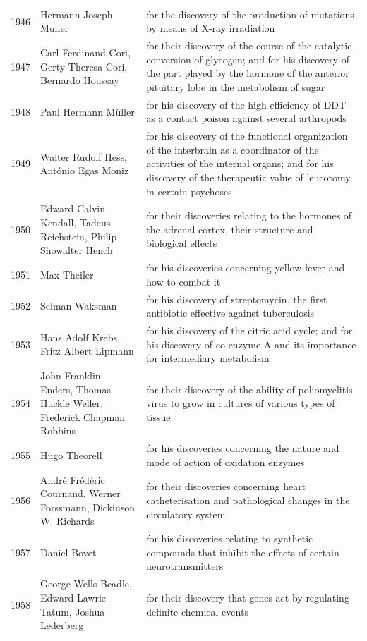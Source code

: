 \documentclass[12pt,a4paper]{book}
\begin{document}
{\begin{longtable}{cp{3.2cm}p{5.5cm}}
1946 & Hermann Joseph Muller & for the discovery of the production of mutations by means of X-ray irradiation \\
1947 & Carl Ferdinand Cori, Gerty Theresa Cori, Bernardo Houssay & for their discovery of the course of the catalytic conversion of glycogen; and for his discovery of the part played by the hormone of the anterior pituitary lobe in the metabolism of sugar \\
1948 & Paul Hermann M\"uller & for his discovery of the high efficiency of DDT as a contact poison against several arthropods \\
1949 & Walter Rudolf Hess, Ant\'onio Egas Moniz & for his discovery of the functional organization of the interbrain as a coordinator of the activities of the internal organs; and for his discovery of the therapeutic value of leucotomy in certain psychoses \\
1950 & Edward Calvin Kendall, Tadeus Reichstein, Philip Showalter Hench & for their discoveries relating to the hormones of the adrenal cortex, their structure and biological effects \\
1951 & Max Theiler & for his discoveries concerning yellow fever and how to combat it \\
1952 & Selman Waksman & for his discovery of streptomycin, the first antibiotic effective against tuberculosis \\
1953 & Hans Adolf Krebs, Fritz Albert Lipmann & for his discovery of the citric acid cycle; and for his discovery of co-enzyme A and its importance for intermediary metabolism \\
1954 & John Franklin Enders, Thomas Huckle Weller, Frederick Chapman Robbins & for their discovery of the ability of poliomyelitis virus to grow in cultures of various types of tissue \\
1955 & Hugo Theorell & for his discoveries concerning the nature and mode of action of oxidation enzymes \\
1956 & Andr\'e Fr\'ed\'eric Cournand, Werner Forssmann, Dickinson W. Richards & for their discoveries concerning heart catheterisation and pathological changes in the circulatory system \\
1957 & Daniel Bovet & for his discoveries relating to synthetic compounds that inhibit the effects of certain neurotransmitters \\
1958 & George Wells Beadle, Edward Lawrie Tatum, Joshua Lederberg & for their discovery that genes act by regulating definite chemical events \\

\end{longtable}}
\end{document}
